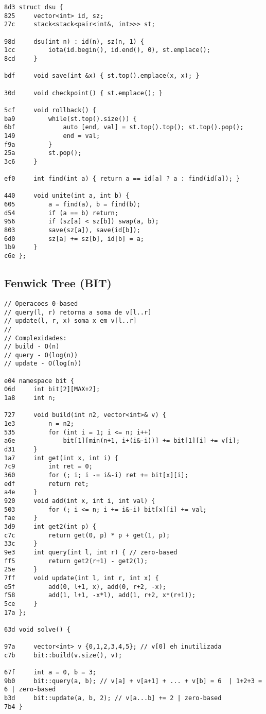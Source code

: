 \documentclass[11pt, a4paper, twoside]{article}
\begin{document}
\begin{lstlisting}
8d3 struct dsu {
825 	vector<int> id, sz;
27c 	stack<stack<pair<int&, int>>> st;
    
98d 	dsu(int n) : id(n), sz(n, 1) { 
1cc 		iota(id.begin(), id.end(), 0), st.emplace(); 
8cd 	}
    		
bdf 	void save(int &x) { st.top().emplace(x, x); }
    
30d 	void checkpoint() { st.emplace(); }
    	
5cf 	void rollback() {
ba9 		while(st.top().size()) {
6bf 			auto [end, val] = st.top().top(); st.top().pop();
149 			end = val;
f9a 		}
25a 		st.pop();
3c6 	}
    
ef0 	int find(int a) { return a == id[a] ? a : find(id[a]); }
    
440 	void unite(int a, int b) {
605 		a = find(a), b = find(b);
d54 		if (a == b) return;
956 		if (sz[a] < sz[b]) swap(a, b);
803 		save(sz[a]), save(id[b]);
6d0 		sz[a] += sz[b], id[b] = a;
1b9 	}
c6e };
\end{lstlisting}

\subsection{Fenwick Tree (BIT)}
\begin{lstlisting}
// Operacoes 0-based
// query(l, r) retorna a soma de v[l..r]
// update(l, r, x) soma x em v[l..r]
//
// Complexidades:
// build - O(n)
// query - O(log(n))
// update - O(log(n))

e04 namespace bit {
06d 	int bit[2][MAX+2];
1a8 	int n;
    
727 	void build(int n2, vector<int>& v) {
1e3 		n = n2;
535 		for (int i = 1; i <= n; i++)
a6e 			bit[1][min(n+1, i+(i&-i))] += bit[1][i] += v[i];
d31 	}
1a7 	int get(int x, int i) {
7c9 		int ret = 0;
360 		for (; i; i -= i&-i) ret += bit[x][i];
edf 		return ret;
a4e 	}
920 	void add(int x, int i, int val) {
503 		for (; i <= n; i += i&-i) bit[x][i] += val;
fae 	}
3d9 	int get2(int p) {
c7c 		return get(0, p) * p + get(1, p);
33c 	}
9e3 	int query(int l, int r) { // zero-based
ff5 		return get2(r+1) - get2(l);
25e 	}
7ff 	void update(int l, int r, int x) {
e5f 		add(0, l+1, x), add(0, r+2, -x);
f58 		add(1, l+1, -x*l), add(1, r+2, x*(r+1));
5ce 	}
17a };

63d void solve() {
    
97a 	vector<int> v {0,1,2,3,4,5}; // v[0] eh inutilizada
c7b 	bit::build(v.size(), v);
    
67f 	int a = 0, b = 3;
9b0 	bit::query(a, b); // v[a] + v[a+1] + ... + v[b] = 6  | 1+2+3 = 6 | zero-based
b3d 	bit::update(a, b, 2); // v[a...b] += 2 | zero-based
7b4 }
\end{lstlisting}
\end{document}
